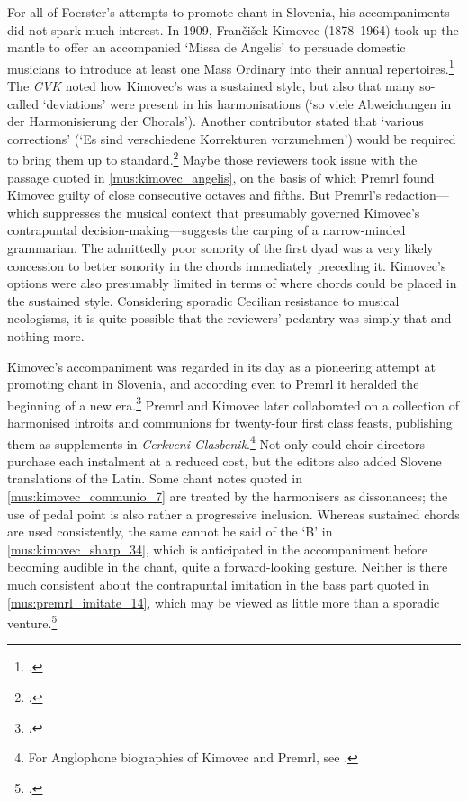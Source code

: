 For all of Foerster's attempts to promote chant in Slovenia, his accompaniments did not spark much interest.
In 1909, Frančišek Kimovec (1878--1964) took up the mantle to offer an accompanied `Missa de Angelis' to persuade domestic musicians to introduce at least one Mass Ordinary into their annual repertoires.\footnote{\covid{}\cite{KimovecMissaAngelisCod1908}.}
The \emph{CVK} noted how Kimovec's was a sustained style, but also that many so-called `deviations' were present in his harmonisations (`so viele Abweichungen in der Harmonisierung der Chorals').
Another contributor stated that `various corrections' (`Es sind verschiedene Korrekturen vorzunehmen') would be required to bring them up to standard.\footnote{.}
Maybe those reviewers took issue with the passage quoted in \cref{mus:kimovec_angelis}, on the basis of which Premrl found Kimovec guilty of close consecutive octaves and fifths.
But Premrl's redaction---which suppresses the musical context that presumably governed Kimovec's contrapuntal decision-making---suggests the carping of a narrow-minded grammarian.
The admittedly poor sonority of the first dyad was a very likely concession to better sonority in the chords immediately preceding it.
Kimovec's options were also presumably limited in terms of where chords could be placed in the sustained style.
Considering sporadic Cecilian resistance to musical neologisms, it is quite possible that the reviewers' pedantry was simply that and nothing more.
\noclub[2]

Kimovec's accompaniment was regarded in its day as a pioneering attempt at promoting chant in Slovenia, and according even to Premrl it heralded the beginning of a new era.\footcite[6--7]{PremrlMissaAngelis1909}
Premrl and Kimovec later collaborated on a collection of harmonised introits and communions for twenty-four first class feasts, publishing them as supplements in \emph{Cerkveni Glasbenik}.\footnote{For Anglophone biographies of Kimovec and Premrl, see \cite[pp.~182 n.~27, 183 n.~28]{SkuljSurveyEvolutionSlovene1995}.}
Not only could choir directors purchase each instalment at a reduced cost, but the editors also added Slovene translations of the Latin.
Some chant notes quoted in \cref{mus:kimovec_communio_7} are treated by the harmonisers as dissonances; the use of pedal point is also rather a progressive inclusion.
Whereas sustained chords are used consistently, the same cannot be said of the `B'\kern 1pt\natural{} in \cref{mus:kimovec_sharp_34}, which is anticipated in the accompaniment before becoming audible in the chant, quite a forward-looking gesture.
Neither is there much consistent about the contrapuntal imitation in the bass part quoted in \cref{mus:premrl_imitate_14}, which may be viewed as little more than a sporadic venture.\footcite[7, 34, 14]{KimovecIntroitusCommunionespro1909}


